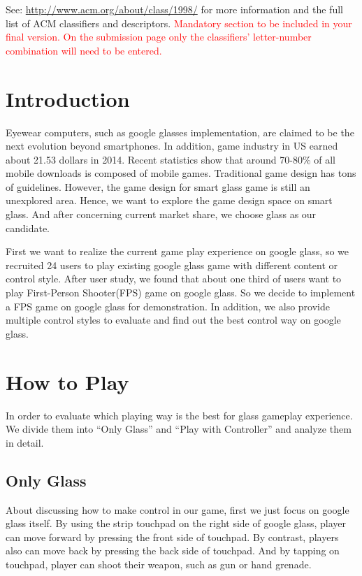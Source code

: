 \documentclass{sigchi}
\begin{document}


See: \url{http://www.acm.org/about/class/1998/}
for more information and the full list of ACM classifiers
and descriptors. 
\textcolor{red}{Mandatory section to be included in your
final version. On the submission page only the classifiers'
letter-number combination will need to be entered.}

\section{Introduction}
Eyewear computers, such as google glasses implementation, are claimed to be the next evolution beyond smartphones. In addition, game industry in US earned about 21.53 dollars in 2014\cite{essentialfacts}. Recent statistics show that around 70-80\% of all mobile downloads is composed of mobile games\cite{statistics,infographic}. Traditional game design has tons of guidelines\cite{videogame,mobilegame,bodygame,gameflow,argame,wearable}. However, the game design for smart glass game is still an unexplored area. Hence, we want to explore the game design space on smart glass. And after concerning current market share, we choose glass as our candidate.

First we want to realize the current game play experience on google glass, so we recruited 24 users to play existing google glass game\cite{minigame} with different content or control style. After user study, we found that about one third of users want to play First-Person Shooter(FPS) game on google glass. So we decide to implement a FPS game on google glass for demonstration. In addition, we also provide multiple control styles to evaluate and find out the best control way on google glass. 

\section{How to Play}
In order to evaluate which playing way is the best for glass gameplay experience. We divide them into ``Only Glass'' and ``Play with Controller'' and analyze them in detail.

\subsection{Only Glass}
About discussing how to make control in our game, first we just focus on google glass itself. By using the strip touchpad on the right side of google glass, player can move forward by pressing the front side of touchpad. By contrast, players also can move back by pressing the back side of touchpad. And by tapping on touchpad, player can shoot their weapon, such as gun or hand grenade.
\end{document}
